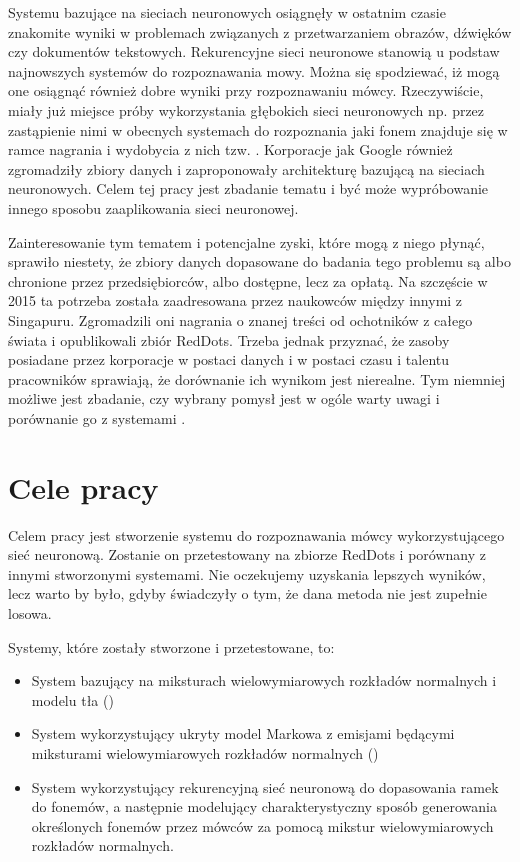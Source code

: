 Systemu bazujące na sieciach neuronowych osiągnęły w ostatnim czasie znakomite wyniki w problemach
związanych z przetwarzaniem obrazów, dźwięków czy dokumentów tekstowych. Rekurencyjne sieci neuronowe
stanowią u podstaw najnowszych systemów do rozpoznawania mowy. Można się spodziewać, iż mogą one
osiągnąć również dobre wyniki przy rozpoznawaniu mówcy. Rzeczywiście, miały już miejsce próby
wykorzystania głębokich sieci neuronowych np. przez zastąpienie nimi  w obecnych systemach do rozpoznania 
jaki fonem znajduje się w ramce nagrania i wydobycia z nich tzw. .
Korporacje jak Google również zgromadziły zbiory danych i zaproponowały architekturę bazującą na sieciach
neuronowych. Celem tej pracy jest zbadanie tematu i być może wypróbowanie innego sposobu zaaplikowania
sieci neuronowej.

Zainteresowanie tym tematem i potencjalne zyski, które mogą z niego płynąć, sprawiło niestety, 
że zbiory danych dopasowane do badania tego problemu są albo chronione przez przedsiębiorców, 
albo dostępne, lecz za opłatą. Na szczęście w 2015 ta potrzeba
została zaadresowana przez naukowców między innymi z Singapuru. Zgromadzili oni nagrania o znanej
treści od ochotników z całego świata i opublikowali zbiór RedDots. Trzeba jednak przyznać, że
zasoby posiadane przez korporacje w postaci danych i w postaci czasu i talentu pracowników sprawiają,
że dorównanie ich wynikom jest nierealne. Tym niemniej możliwe jest zbadanie, czy wybrany pomysł
jest w ogóle warty uwagi i porównanie go z systemami .

\section{Cele pracy}\label{sec:cele_pracy}

Celem pracy jest stworzenie systemu do rozpoznawania mówcy wykorzystującego sieć neuronową. 
Zostanie on przetestowany na zbiorze RedDots i porównany z innymi stworzonymi systemami.
Nie oczekujemy uzyskania lepszych wyników, lecz warto by było, gdyby świadczyły o tym,
że dana metoda nie jest zupełnie losowa.

Systemy, które zostały stworzone i przetestowane, to:

\begin{itemize}
    \item System bazujący na miksturach wielowymiarowych rozkładów normalnych i modelu tła ()
    \item System wykorzystujący ukryty model Markowa z emisjami będącymi miksturami wielowymiarowych rozkładów normalnych ()
    \item System wykorzystujący rekurencyjną sieć neuronową do dopasowania ramek do fonemów, a następnie modelujący charakterystyczny sposób generowania określonych fonemów przez mówców za pomocą mikstur wielowymiarowych rozkładów normalnych.
\end{itemize}

